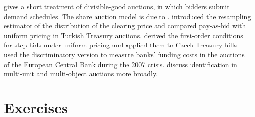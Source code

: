  gives a short treatment of divisible-good auctions, in which bidders submit demand
schedules. The share auction model is due to \citet{Wilson1979}. \citet{HortacsuMcAdams2010} introduced the
resampling estimator of the distribution of the clearing price and compared pay-as-bid with uniform pricing in
Turkish Treasury auctions. \citet{Kastl2011} derived the first-order conditions for step bids under uniform
pricing and applied them to Czech Treasury bills. \citet{CassolaHortacsuKastl2013} used the discriminatory
version to measure banks' funding costs in the auctions of the European Central Bank during the 2007 crisis.
\citet[Section~10]{AtheyHaile2007} discuss identification in multi-unit and multi-object auctions more
broadly.

\section{Exercises}\label{sec:15-exercises}

